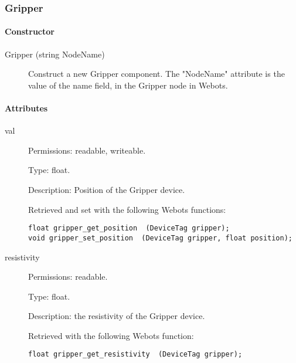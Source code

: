 \subsubsection{Gripper}
\label{webots.uobjects.robotdevices.gripper}%

\paragraph{Constructor}
\label{webots.uobjects.robotdevices.gripper.constructor}%

\noindent
\begin{description}
\item[{Gripper (string NodeName)}] Construct a new Gripper component. The "NodeName" attribute is the value
          of the name field, in the Gripper node in Webots.

\end{description}

\paragraph{Attributes}
\label{webots.uobjects.robotdevices.gripper.attributes}%

\noindent
\begin{description}
\item[{         val
 }]            Permissions: readable, writeable.


 Type: float.


 Description: Position of the Gripper device.


 Retrieved and set with the following Webots functions:


\begin{lstlisting}[firstnumber=1,]
float gripper_get_position  (DeviceTag gripper);
void gripper_set_position  (DeviceTag gripper, float position);
\end{lstlisting}
\item[{         resistivity
 }]            Permissions: readable.


 Type: float.


 Description: the resistivity of the Gripper device.


 Retrieved with the following Webots function:


\begin{lstlisting}[firstnumber=1,]
float gripper_get_resistivity  (DeviceTag gripper);
\end{lstlisting}
\end{description}

